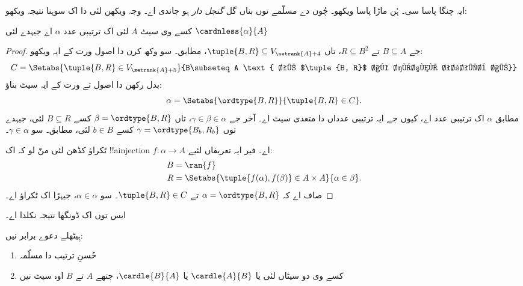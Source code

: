\documentclass[../../../include/open-logic-section]{subfiles}
\begin{document}

ایہ چنگا پاسا سی۔ ہُن ماڑا پاسا ویکھو۔ چُون دے مسلّمے توں بناں گل \emph{گنجل دار} ہو جاندی اے۔ وجہ ویکھن لئی \cite{Hartogs1915} دا اک سوہنا نتیجہ ویکھو:

\begin{lem}[\emph{$\ZF$ وچ}]
کسے وی سیٹ $A$ لئی اک ترتیبی عدد $\alpha$ اے جیہدے لئی $\cardnless{\alpha}{A}$
\end{lem}

\begin{proof}
جے $B \subseteq A$ تے $R \subseteq B^2$، تاں $\tuple{B, R} \subseteq
V_{\setrank{A}+4}$،  مطابق۔ سو وکھ کرن دا اصول ورت کے ایہ ویکھو:
\[
	C = \Setabs{\tuple{B, R} \in V_{\setrank{A}+5}}{B\subseteq A
	\text{ تے $\tuple{B, R}$ اک حُسنِ ترتیب اے}}
\]
بدل رکھن دا اصول تے  ورت کے ایہ سیٹ بناؤ:
\[
	\alpha = \Setabs{\ordtype{B, R}}{\tuple{B, R} \in C}.
\]
 مطابق $\alpha$ اک ترتیبی عدد اے، کیوں جے ایہ ترتیبی عدداں دا متعدی سیٹ اے۔ آخر جے $\gamma \in \beta \in \alpha$، تاں $\beta = \ordtype{B, R}$ کسے $B \subseteq R$ لئی، جیہدے توں $\gamma = \ordtype{B_b, R_b}$ کسے $b
\in B$ لئی،  مطابق۔ سو $\gamma \in \alpha$۔

ٹکراؤ کڈھن لئی منّ لو کہ اک !!a{injection} $f \colon \alpha \to A$ اے۔ فیر ایہ تعریفاں لئیے:
\begin{align*}
	B &= \ran{f}\\
	R &= \Setabs{\tuple{f(\alpha), f(\beta)} \in A \times A}{\alpha \in \beta}.
\end{align*}
صاف اے کہ $\alpha = \ordtype{B, R}$ تے $\tuple{B, R} \in C$۔ سو $\alpha
\in \alpha$، جیہڑا اک ٹکراؤ اے۔
\end{proof}

ایس توں اک ڈونگھا نتیجہ نکلدا اے۔

\begin{thm}[\emph{$\ZF$ وچ}]
ہِیٹھلے دعوے برابر نیں:
\begin{enumerate}
	\item{} حُسنِ ترتیب دا مسلّمہ
	\item{} کسے وی دو سیٹاں لئی یا $\cardle{A}{B}$ یا
	$\cardle{B}{A}$، جتھے $A$ تے $B$ اوہ سیٹ نیں
\end{enumerate}
\end{thm}
\end{document}

